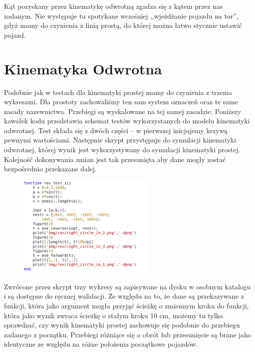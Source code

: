 \documentclass[a4paper, 12pt]{report}
\begin{document}
				\noindent Kąt pozyskany przez kinematykę odwrotną zgadza się z kątem przez nas zadanym. Nie występuje tu spotykane wcześniej ,,wjeżdżanie pojazdu na tor'', gdyż mamy do czynienia z linią prostą, do której można łatwo stycznie ustawić pojazd.
			\newpage
		\section{Kinematyka Odwrotna}
			Podobnie jak w testach dla kinematyki prostej mamy do czynienia z trzema wykresami. Dla prostoty zachowaliśmy ten sam system oznaczeń oraz te same zasady nazewnictwa. Przebiegi są wyskalowane na tej samej zasadzie.
			\newline
			\newline
			Poniższy kawałek kodu przedstawia schemat testów wykorzystanych do modelu kinematyki odwrotnej. Test składa się z dwóch części -- w pierwszej inicjujemy krzywą pewnymi wartościami. Następnie skrypt przystępuje do symulacji kinematyki odwrotnej, której wynik jest wykorzystywany do symulacji kinematyki prostej. Kolejność dokonywania zmian jest tak przesunięta aby dane mogły zostać bezpośrednio przekazane dalej.
			\begin{figure}[H]
				\centering
				\includegraphics[width = 0.6\textwidth]{./codes/inv_test.png}
			\end{figure}
			\noindent Zwrócone przez skrypt trzy wykresy są zapisywane na dysku w osobnym katalogu i są dostępne do ręcznej walidacji.
			\newline
			\newline
			Ze względu na to, że dane są przekazywane z funkcji, która jako argument mogła przyjąć ścieżkę o zmiennym kroku do funkcji, która jako wynik zwraca ścieżkę o stałym kroku 10 cm, możemy tu tylko sprawdzać, czy wynik kinematyki prostej zachowuje się podobnie do przebiegu zadanego z początku. Przebiegi różniące się o obrót lub przesunięcie są brane jako identyczne ze względu na różne położenia początkowe pojazdów.
			\newpage
\end{document}
